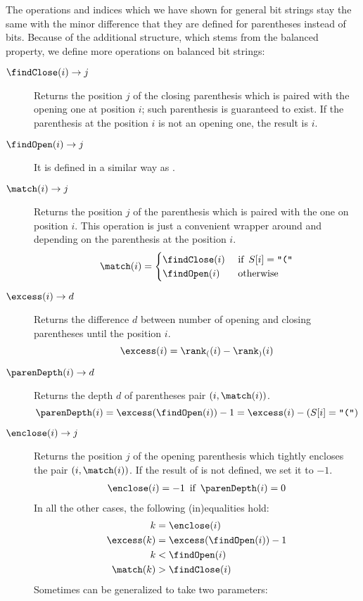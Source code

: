 The operations and indices which we have shown for general bit strings stay the same with the minor difference that they are defined for parentheses instead of bits.
Because of the additional structure, which stems from the balanced property, we define more operations on balanced bit strings:
\begin{description}
	\item[$\findClose(i) \rightarrow j$]
	Returns the position $j$ of the closing parenthesis which is paired with the opening one at position $i$; such parenthesis is guaranteed to exist.
	If the parenthesis at the position $i$ is not an opening one, the result is $i$.
	
	\item[$\findOpen(i) \rightarrow j$]
	It is defined in a similar way as \findClose.
	
	\item[$\match(i) \rightarrow j$]
	Returns the position $j$ of the parenthesis which is paired with the one on position $i$.
	This operation is just a convenient wrapper around \findOpen{} and \findClose{} depending on the parenthesis at the position $i$.
	$$ \match(i) = 
	\begin{cases}
		\findClose(i) & \textif S[i] = \openingParen \\
		\findOpen(i) & \textotherwise
	\end{cases}$$
	
	\item[$\excess(i) \rightarrow d$]
	Returns the difference $d$ between number of opening and closing parentheses until the position $i$.
	$$ \excess(i) = \rank_((i) - \rank_)(i)$$
	
	\item[$\parenDepth(i) \rightarrow d$]
	Returns the depth $d$ of parentheses pair $(i, \match(i))$.
	$$ \parenDepth(i) = \excess(\findOpen(i)) - 1 = \excess(i) - (S[i] = \openingParen) $$
	
	\item[$\enclose(i) \rightarrow j$]
	Returns the position $j$ of the opening parenthesis which tightly encloses the pair $(i, \match(i))$.
	If the result of \enclose{} is not defined, we set it to $-1$.
	\begin{align*}
		\enclose(i) = -1 \textif \parenDepth(i) = 0
	\end{align*}
	In all the other cases, the following (in)equalities hold:
	\begin{align*}
		k &= \enclose(i) \\
		\excess(k) &= \excess(\findOpen(i)) - 1 \\
		k &< \findOpen(i) \\
		\match(k) &> \findClose(i)
	\end{align*}
	Sometimes \enclose{} can be generalized to take two parameters:
	

\end{description}
